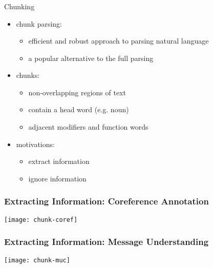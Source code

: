 \begin{frame}[fragile]\frametitle{}

\begin{center}
{\Large Chunking}
\end{center}
\end{frame}

\begin{frame}[fragile]
\begin{itemize}
\item chunk parsing:
  \begin{itemize}
    \item efficient and robust approach to parsing natural language
    \item a popular alternative to the full parsing
  \end{itemize}
\item chunks:
  \begin{itemize}
  \item non-overlapping regions of text
  \item contain a head word (e.g. noun)
  \item adjacent modifiers and function words
  \end{itemize}
\item motivations:
  \begin{itemize}
  \item extract information
  \item ignore information
  \end{itemize}
\end{itemize}
\end{frame}

\begin{frame}[fragile]
  \frametitle{Extracting Information: Coreference Annotation}
\begin{center}
\texttt{[image: chunk-coref]}
\end{center}
\end{frame}

\begin{frame}[fragile]
  \frametitle{Extracting Information: Message Understanding}
\begin{center}
\texttt{[image: chunk-muc]}
\end{center}
\end{frame}


